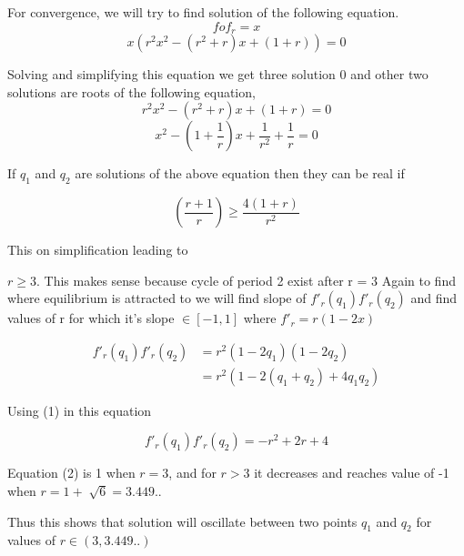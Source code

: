 \documentclass{report}
\begin{document}
For convergence, we will try to find solution of the following equation.
\begin{equation}
     fof_r = x \nonumber
\end{equation}
\begin{equation}
    x(r^2x^2 - (r^2+r)x+(1+r)) = 0 \nonumber
\end{equation}

Solving and simplifying this equation we get three solution 0 and other two solutions are roots of the following equation, \newline
\begin{equation}
r^2x^2 - (r^2+r)x+(1+r) = 0 \nonumber
\end{equation}
\begin{equation}
x^2 - (1+\frac{1}{r})x + \frac{1}{r^2} + \frac{1}{r} = 0
\end{equation}


If $q_1$ and $q_2$ are solutions of the above equation then they can be real if

\begin{equation}
    (\frac{r+1}{r}) \geq \frac{4(1+r)}{r^2} \nonumber
\end{equation}


This on simplification leading to \newline

$r \geq 3$. This makes sense because cycle of period 2 exist after r = 3 \newline
Again to find where equilibrium is attracted to we will find slope of $f'_r(q_1)f'_r(q_2)$ and find values of r for which it's slope $\in [-1,1]$ where $f'_r = r(1-2x)$

\begin{align}
f'_r(q_1)f'_r(q_2) &= r^2(1 - 2q_1)(1 - 2q_2) \nonumber \\
 &= r^2(1 - 2(q_1+q_2) + 4q_1q_2) \nonumber
\end{align}

Using (1) in this equation

\begin{equation}
f'_r(q_1)f'_r(q_2) = -r^2 + 2r + 4
\end{equation}

\newpage

Equation (2) is 1 when $r = 3$, and for $r > 3$  it decreases and reaches value of -1 when $r = 1 + \sqrt[]{6} = 3.449..$
\newline

Thus this shows that solution will oscillate between two points $q_1$ and $q_2$ for values of $r \in (3,3.449..)$
\end{document}
